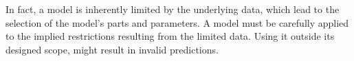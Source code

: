
In fact, a model is inherently limited by the underlying data, which lead to the selection of the model's parts and parameters.
A model must be carefully applied to the implied restrictions resulting from the limited data.
Using it outside its designed scope, might result in invalid predictions.
